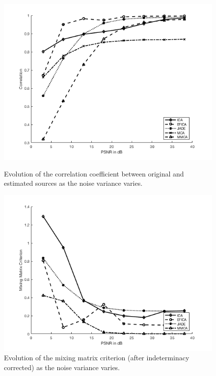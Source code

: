 \begin{figure}[!tbp]
\centering
\begin{minipage}[b]{0.85\textwidth}
\includegraphics[width=\textwidth]{images/corr_plot_seg.png}
\caption{Evolution of the correlation coefficient between original and estimated sources as the noise variance varies.}
\end{minipage}

\begin{minipage}[b]{0.85\textwidth}
\includegraphics[width=\textwidth]{images/mmc_plot_seg.png}
\caption{Evolution of the mixing matrix criterion (after indeterminacy corrected) as the noise variance varies.}
\end{minipage}
\label{imapint1}
\end{figure}

